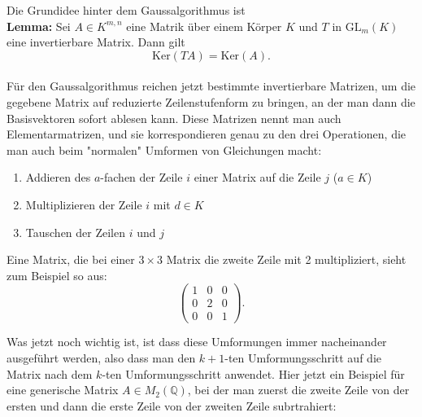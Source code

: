 \documentclass[11pt,a4paper]{article}
\begin{document}
\noindent
Die Grundidee hinter dem Gaussalgorithmus ist\\
\textbf{Lemma:} Sei $A\in K^{m,n}$ eine Matrik über einem Körper $K$ und $T$ in $\mathrm{GL}_m(K)$ eine invertierbare Matrix. Dann gilt $$ \mathrm{Ker}(TA) = \mathrm{Ker}(A).$$\\
	
	Für den Gaussalgorithmus reichen jetzt bestimmte invertierbare Matrizen, um die gegebene Matrix auf reduzierte Zeilenstufenform zu bringen, an der man dann die Basisvektoren sofort ablesen kann. Diese Matrizen nennt man auch Elementarmatrizen, und sie korrespondieren genau zu den drei Operationen, die man auch beim "normalen" Umformen von Gleichungen macht:
	\begin{enumerate}
	\item Addieren des $a$-fachen der Zeile $i$ einer Matrix auf die Zeile $j$ ($a\in K$)
	\item Multiplizieren der Zeile $i$ mit $d\in K$
	\item Tauschen der Zeilen $i$ und $j$
	\end{enumerate}
	Eine Matrix, die bei einer $3\times 3$ Matrix die zweite Zeile mit 2 multipliziert, sieht zum Beispiel so aus:
	\[ \begin{pmatrix} 1 & 0&0 \\0&2&0\\ 0&0&1\end{pmatrix}.\]
	
	
	Was jetzt noch wichtig ist, ist dass diese Umformungen immer nacheinander ausgeführt werden, also dass man den $k+1$-ten Umformungsschritt auf die Matrix nach dem $k$-ten Umformungsschritt anwendet.
	Hier jetzt ein Beispiel für eine generische Matrix $A\in M_2(\mathbb{Q})$, bei der man zuerst die zweite Zeile von der ersten und dann die erste Zeile von der zweiten Zeile subrtrahiert:
	
\end{document}
